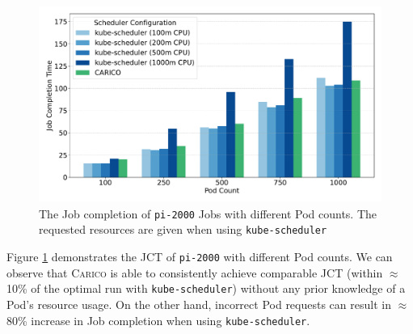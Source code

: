 \begin{figure}[ht!]
    \centering
    \includegraphics[width=\textwidth]{images/pi-job-completion.pdf}
    \caption{The Job completion of \texttt{pi-2000} Jobs with different Pod
    counts. The requested resources are given when using \texttt{kube-scheduler}}
    \label{fig:pi-2000-throughput}
\end{figure}

Figure \ref{fig:pi-2000-throughput} demonstrates the JCT of
\texttt{pi-2000} with different Pod counts. We can observe that \textsc{Carico}
is able to consistently achieve comparable JCT (within $\approx$
10\% of the optimal run with \texttt{kube-scheduler}) without any prior
knowledge of a Pod's resource usage. On the other hand, incorrect Pod requests
can result in $\approx$ 80\% increase in Job completion when using
\texttt{kube-scheduler}.


